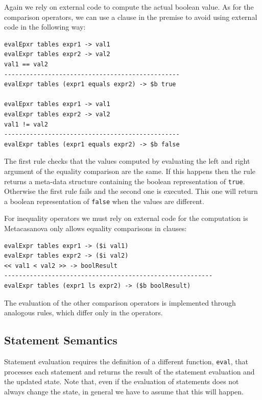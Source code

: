 \noindent
Again we rely on external code to compute the actual boolean value.
As for the comparison operators, we can use a clause in the premise to avoid using external code in the following way:

\begin{lstlisting}
evalEpxr tables expr1 -> val1
evalExpr tables expr2 -> val2
val1 == val2
------------------------------------------------
evalExpr tables (expr1 equals expr2) -> $b true

evalEpxr tables expr1 -> val1
evalExpr tables expr2 -> val2
val1 != val2
------------------------------------------------
evalExpr tables (expr1 equals expr2) -> $b false
\end{lstlisting}

\noindent
The first rule checks that the values computed by evaluating the left and right argument of the equality comparison are the same. If this happens then the rule returns a meta-data structure containing the boolean representation of \texttt{true}. Otherwise the first rule fails and the second one is executed. This one will return a boolean representation of \texttt{false} when the values are different.

For inequality operators we must rely on external code for the computation is Metacasanova only allows equality comparisons in clauses:

\begin{lstlisting}
evalExpr tables expr1 -> ($i val1)
evalExpr tables expr2 -> ($i val2)
<< val1 < val2 >> -> boolResult
---------------------------------------------------------
evalExpr tables (expr1 ls expr2) -> ($b boolResult)
\end{lstlisting}

\noindent
The evaluation of the other comparison operators is implemented through analogous rules, which differ only in the operators.

\subsection{Statement Semantics}
\label{subsec:ch_mcnv_languages_statement_semantics}

Statement evaluation requires the definition of a different function, \texttt{eval}, that processes each statement and returns the result of the statement evaluation and the updated state. Note that, even if the evaluation of statements does not always change the state, in general we have to assume that this will happen.

